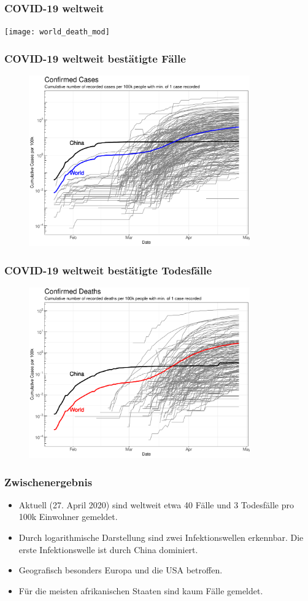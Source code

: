 \documentclass{beamer}
\begin{document}
 \begin{frame}
 	\frametitle{COVID-19 weltweit}
		\centering
		\texttt{[image: world\_death\_mod]}
 \end{frame}
 
 \begin{frame}
 	\frametitle{COVID-19 weltweit bestätigte Fälle}
	\begin{figure}
		\centering
		\includegraphics[width = 270pt]{Cases_cumulative_confirmed.pdf}
	\end{figure}
 \end{frame}

 \begin{frame}
 	\frametitle{COVID-19 weltweit bestätigte Todesfälle}
	\begin{figure}
		\centering
		\includegraphics[width = 270pt]{Cases_cumulative_deaths.pdf}
	\end{figure}
 \end{frame}

 \begin{frame}
 	\frametitle{Zwischenergebnis}
 	\begin{itemize}
 		\item Aktuell (27. April 2020) sind weltweit etwa 40 Fälle und 3 Todesfälle pro 100k Einwohner gemeldet.
 		\item Durch logarithmische Darstellung sind zwei Infektionswellen erkennbar. Die erste Infektionswelle ist durch China dominiert.
 		\item Geografisch besonders Europa und die USA betroffen. 
 		\item Für die meisten afrikanischen Staaten sind kaum Fälle gemeldet.
 	\end{itemize}
 \end{frame}
\end{document}
